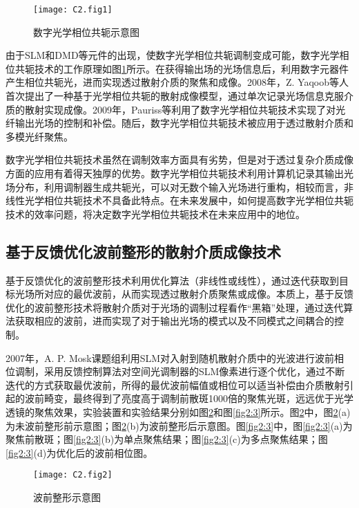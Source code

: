 \begin{figure}[htp]
	\centering
	\texttt{[image: C2.fig1]}
	\caption{数字光学相位共轭示意图}
	\label{fig2:1}
\end{figure}

由于SLM和DMD等元件的出现，使数字光学相位共轭调制变成可能，数字光学相位共轭技术的工作原理如图\ref{fig2:1}所示。在获得输出场的光场信息后，利用数字元器件产生相位共轭光，进而实现透过散射介质的聚焦和成像。2008年，Z. Yaqoob等\cite{yaqoob_optical_2008}人首次提出了一种基于光学相位共轭的散射成像模型，通过单次记录光场信息克服介质的散射实现成像。2009年，Pauriss等\cite{paurisse_phase_2009}利用了数字光学相位共轭技术实现了对光纤输出光场的控制和补偿。随后，数字光学相位共轭技术被应用于透过散射介质和多模光纤聚焦\cite{cui_implementation_2010,lhermite_coherent_2010}。

数字光学相位共轭技术虽然在调制效率方面具有劣势，但是对于透过复杂介质成像方面的应用有着得天独厚的优势。数字光学相位共轭技术利用计算机记录其输出光场分布，利用调制器生成共轭光，可以对无数个输入光场进行重构，相较而言，非线性光学相位共轭技术不具备此特点。在未来发展中，如何提高数字光学相位共轭技术的效率问题，将决定数字光学相位共轭技术在未来应用中的地位。

\subsection{基于反馈优化波前整形的散射介质成像技术}

基于反馈优化的波前整形技术利用优化算法（非线性或线性），通过迭代获取到目标光场所对应的最优波前，从而实现透过散射介质聚焦或成像。本质上，基于反馈优化的波前整形技术将散射介质对于光场的调制过程看作“黑箱”处理，通过迭代算法获取相应的波前，进而实现了对于输出光场的模式以及不同模式之间耦合的控制。

2007年，A. P. Mosk\cite{Vellekoop2007}课题组利用SLM对入射到随机散射介质中的光波进行波前相位调制，采用反馈控制算法对空间光调制器的SLM像素进行逐个优化，通过不断迭代的方式获取最优波前，所得的最优波前幅值或相位可以适当补偿由介质散射引起的波前畸变，最终得到了亮度高于调制前散斑1000倍的聚焦光斑，远远优于光学透镜的聚焦效果，实验装置和实验结果分别如图\ref{fig2:2}和图\ref{fig2:3}所示。图\ref{fig2:2}中，图\ref{fig2:2}(a)为未波前整形前示意图；图\ref{fig2:2}(b)为波前整形后示意图。图\ref{fig2:3}中，图\ref{fig2:3}(a)为聚焦前散斑；图\ref{fig2:3}(b)为单点聚焦结果；图\ref{fig2:3}(c)为多点聚焦结果；图\ref{fig2:3}(d)为优化后的波前相位图。

\begin{figure}[htp]
	\centering
	\texttt{[image: C2.fig2]}
	\caption{波前整形示意图\cite{Vellekoop2007}}
	\label{fig2:2}
\end{figure}

